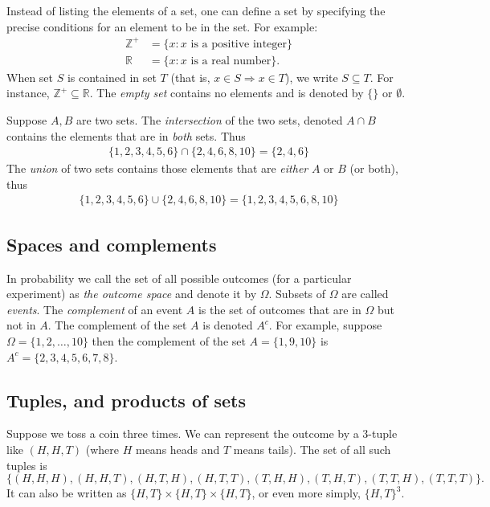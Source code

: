 \documentclass{report}
\theoremstyle{plain}
\theoremstyle{definition}
\begin{document}
Instead of listing the elements of a set, one can define a set by
specifying the precise conditions for an element to be in the set. For
example:
\begin{align*}
\mathbb{Z}^+ &= \{x: \mbox{$x$ is a positive integer}\} \\
\mathbb{R}   &= \{x: \mbox{$x$ is a real number}\} .
\end{align*}
When set $S$ is contained in set $T$ (that is, $x \in S \Rightarrow x
\in T$), we write $S \subseteq T$. For instance, $\mathbb{Z}^+
\subseteq \mathbb{R}$. The {\em empty set} contains no elements and is
denoted by $\{\}$ or $\emptyset$.

Suppose $A,B$ are two sets. The {\em intersection} of the two sets,
denoted $A\cap B$ contains the elements that are in {\em both}
sets. Thus
\begin{align*}
\{1,2,3,4,5,6\} \cap \{2,4,6,8,10\} = \{2,4,6\}
\end{align*}
The {\em union} of two sets contains those elements that are {\em
  either} $A$ or $B$ (or both), thus
\begin{align*}
\{1,2,3,4,5,6\} \cup \{2,4,6,8,10\} = \{1,2,3,4,5,6,8,10\}
\end{align*}

\subsection{Spaces and complements}
In probability we call the set of all possible outcomes (for a
particular experiment) as {\em the outcome space} and denote it by
$\Omega$. Subsets of $\Omega$ are called {\em events}. The {\em
  complement} of an event $A$ is the set of outcomes that are in
$\Omega$ but not in $A$. The complement of the set $A$ is denoted
$A^c$. For example, suppose $\Omega=\{1,2,\ldots,10\}$ then the
complement of the set $A=\{1,9,10\}$ is $A^c=\{2,3,4,5,6,7,8\}$. 

\subsection{Tuples, and products of sets}

Suppose we toss a coin three times. We can represent the outcome by a 3-tuple like
$(H,H,T)$ (where $H$ means heads and $T$ means tails). The set of all
such tuples is
$$ 
\{(H,H,H), (H,H,T), (H,T,H), (H,T,T), (T,H,H), (T,H,T), (T,T,H), (T,T,T)\}.
$$
It can also be written as $\{H,T\} \times \{H,T\} \times \{H,T\}$, or even more 
simply, $\{H,T\}^3$.
\end{document}
